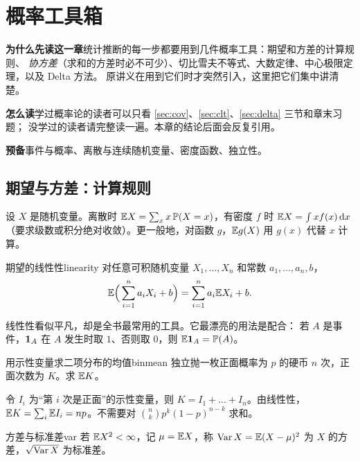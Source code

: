 \setcounter{chapter}{-1}
\chapter{概率工具箱}
\label{ch:prob}

\begin{chapguide}
\textbf{\heiti 为什么先读这一章}\quad 统计推断的每一步都要用到几件概率工具：期望和方差的计算规则、
\emph{协方差}（求和的方差时必不可少）、切比雪夫不等式、大数定律、中心极限定理，以及 Delta 方法。
原讲义在用到它们时才突然引入，这里把它们集中讲清楚。\par\smallskip
\textbf{\heiti 怎么读}\quad 学过概率论的读者可以只看 \ref{sec:cov}、\ref{sec:clt}、\ref{sec:delta} 三节和章末习题；
没学过的读者请完整读一遍。本章的结论后面会反复引用。\par\smallskip
\textbf{\heiti 预备}\quad 事件与概率、离散与连续随机变量、密度函数、独立性。
\end{chapguide}

\section{期望与方差：计算规则}

设 $X$ 是随机变量。离散时 $\mathbb{E} X=\sum_x x\,\mathbb{P}(X=x)$，有密度 $f$ 时 $\mathbb{E} X=\int x f(x)\,\mathrm{d} x$
（要求级数或积分绝对收敛）。更一般地，对函数 $g$，$\mathbb{E} g(X)$ 用 $g(x)$ 代替 $x$ 计算。

\begin{theorem}{期望的线性性}{linearity}
对任意可积随机变量 $X_1,\dots,X_n$ 和常数 $a_1,\dots,a_n,b$，
\[
\mathbb{E}\Big(\sum_{i=1}^n a_iX_i+b\Big)=\sum_{i=1}^n a_i\mathbb{E} X_i+b .
\]
\end{theorem}

线性性看似平凡，却是全书最常用的工具。它最漂亮的用法是配合：
若 $A$ 是事件，$\mathbf{1}_A$ 在 $A$ 发生时取 $1$、否则取 $0$，则 $\mathbb{E}\mathbf{1}_A=\mathbb{P}(A)$。

\begin{example}{用示性变量求二项分布的均值}{binmean}
独立抛一枚正面概率为 $p$ 的硬币 $n$ 次，正面次数为 $K$。求 $\mathbb{E} K$。
\end{example}
\begin{solution}
令 $I_i$ 为“第 $i$ 次是正面”的示性变量，则 $K=I_1+\dots+I_n$。由线性性，
$\mathbb{E} K=\sum_i \mathbb{E} I_i=np$。不需要对 $\binom nk p^k(1-p)^{n-k}$ 求和。
\end{solution}

\begin{definition}{方差与标准差}{var}
若 $\mathbb{E} X^2<\infty$，记 $\mu=\mathbb{E} X$，称 $\operatorname{Var} X=\mathbb{E}(X-\mu)^2$ 为 $X$ 的方差，$\sqrt{\operatorname{Var} X}$ 为标准差。
\end{definition}

